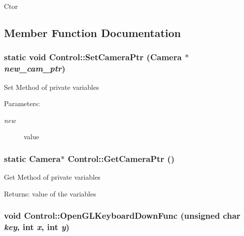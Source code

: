Ctor 

\subsection{Member Function Documentation}
\hypertarget{class_control_8505fd512015d12eee7dff4c986cbbc6}{
\subsubsection[SetCameraPtr]{\setlength{\rightskip}{0pt plus 5cm}static void Control::SetCameraPtr ({\bf Camera} $\ast$ {\em new\_\-cam\_\-ptr})}}
\label{class_control_8505fd512015d12eee7dff4c986cbbc6}


Set Method of private variables \begin{Desc}
\item[Parameters:]
\begin{description}
\item[{\em new}]value \end{description}
\end{Desc}
\hypertarget{class_control_5785fa3a36503f7ebda1d5e6e1760223}{
\subsubsection[GetCameraPtr]{\setlength{\rightskip}{0pt plus 5cm}static {\bf Camera}$\ast$ Control::GetCameraPtr ()}}
\label{class_control_5785fa3a36503f7ebda1d5e6e1760223}


Get Method of private variables \begin{Desc}
\item[Returns:]value of the variables \end{Desc}
\hypertarget{class_control_350ec7cf720a55964bdde6a0ddf4b7bf}{
\subsubsection[OpenGLKeyboardDownFunc]{\setlength{\rightskip}{0pt plus 5cm}void Control::OpenGLKeyboardDownFunc (unsigned char {\em key}, \/  int {\em x}, \/  int {\em y})}}
\label{class_control_350ec7cf720a55964bdde6a0ddf4b7bf}


